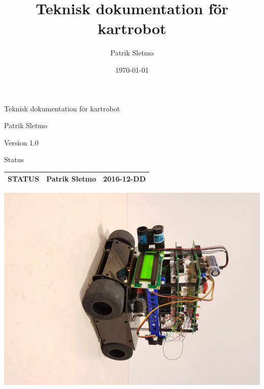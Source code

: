 \documentclass{article}
\title{Teknisk dokumentation för kartrobot}
\author{Patrik Sletmo}
\date{\today}
\begin{document}
\thispagestyle{empty}

{
\sffamily
\centering
\large


{\huge 
Teknisk dokumentation för kartrobot
}

{\large
Patrik Sletmo
}

{\large
Version 1.0
}

\vspace{3.5cm}

Status
\begin{table}[H]
\centering
\begin{tabular}{ | c | c | c | }
\hline
STATUS & Patrik Sletmo & 2016-12-DD \\
\hline
\end{tabular}
\end{table}


\begin{center}
\includegraphics[scale=0.065]{robot_cover_photo}
\end{center}
}

\clearpage
\end{document}
